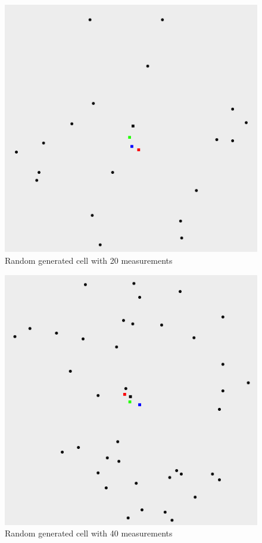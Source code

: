 \documentclass[a4paper, 12pt]{article}
\begin{document}
\newpage
\begin{figure}[h!]
\label{fig:20meas}
\centering
\includegraphics[scale=0.56]{testData_20meas.png}
\caption{Random generated cell with 20 measurements}
\end{figure}

\begin{figure}[h!]
\label{fig:40meas}
\centering
\includegraphics[scale=0.56]{testData_40meas.png}
\caption{Random generated cell with 40 measurements}
\end{figure}
\end{document}
